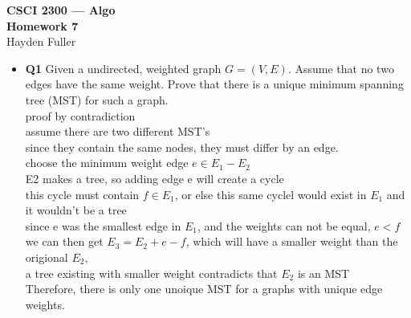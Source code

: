 \documentclass[11pt]{article}
\def\a{\alpha}
\def\b{\beta}
\def\g{\gamma}
\def\d{\delta}
\begin{document}
\thispagestyle{empty}   %


\begin{center}
\large
\textbf{CSCI 2300 --- Algo \\
Homework 7}
\\Hayden Fuller 
\end{center}

\begin{itemize}

\item \textbf{Q1} 
Given a undirected, weighted graph $G=(V,E)$. Assume that no two edges have the same weight. Prove that there is a unique minimum spanning tree (MST) for such a graph.
\\proof by contradiction
\\assume there are two different MST's 
\\since they contain the same nodes, they must differ by an edge.
\\choose the minimum weight edge $e\in E_1-E_2$
\\E2 makes a tree, so adding edge e will create a cycle
\\this cycle must contain $f\in E_1$, or else this same cyclel would exist in $E_1$ and it wouldn't be a tree
\\since e was the smallest edge in $E_1$, and the weights can not be equal, $e<f$
\\we can then get $E_3=E_2+e-f$, which will have a smaller weight than the origional $E_2$,
\\a tree existing with smaller weight contradicts that $E_2$ is an MST
\\Therefore, there is only one unoique MST for a graphs with unique edge weights.

\vspace{0.1in}


\end{itemize}
\end{document}
